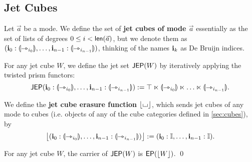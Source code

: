 \documentclass[a4paper]{article}
\begin{document}
\subsection{Jet Cubes}
\begin{definition} \label{def:jet-cube}
	Let $\vec a$ be a mode.
	We define the set of \textbf{jet cubes of mode $\vec a$} essentially as the set of lists of degrees $0 \leq i < \mathsf{len}(\vec a)$, but we denote them as
	$(\mathbf{i}_0 : {\llparenthesis \rightarrowtriangle_{i_0} \rrparenthesis}, \ldots, \mathbf{i}_{n-1} : {\llparenthesis \rightarrowtriangle_{i_{n-1}} \rrparenthesis})$, thinking of the names $\mathbf{i}_k$ as De Bruijn indices.
\end{definition}
\begin{definition} \label{def:jep}
	For any jet cube $W$, we define the jet set $\mathsf{JEP}(W)$ by iteratively applying the twisted prism functors:
	\[
		\mathsf{JEP}(\mathbf{i}_0 : {\llparenthesis \rightarrowtriangle_{i_0} \rrparenthesis}, \ldots, \mathbf{i}_{n-1} : {\llparenthesis \rightarrowtriangle_{i_{n-1}} \rrparenthesis})
		:= \top \ltimes {\llparenthesis \rightarrowtriangle_{i_0} \rrparenthesis} \ltimes \ldots \ltimes {\llparenthesis \rightarrowtriangle_{i_{n-1}} \rrparenthesis}.
	\]
\end{definition}
\begin{definition} \label{def:jet-cube-erasure}
	We define the \textbf{jet cube erasure function} $\mathopen{}\left\lfloor {\llcorner\hspace{-.4ex}\lrcorner} \right\rfloor\mathclose{}$, which sends jet cubes of any mode to cubes (i.e. objects of any of the cube categories defined in \cref{sec:cubes}), by
	\[
		\mathopen{}\left\lfloor (\mathbf{i}_0 : {\llparenthesis \rightarrowtriangle_{i_0} \rrparenthesis}, \ldots, \mathbf{i}_{n-1} : {\llparenthesis \rightarrowtriangle_{i_{n-1}} \rrparenthesis}) \right\rfloor\mathclose{} := (\mathbf{i}_0 : {\mathbb I}, \ldots, \mathbf{i}_{n-1} : {\mathbb I}).
	\]
\end{definition}
\begin{corollary}
	For any jet cube $W$, the carrier of $\mathsf{JEP}(W)$ is $\mathsf{EP}(\mathopen{}\left\lfloor W \right\rfloor\mathclose{})$. \qed
\end{corollary}
\end{document}
